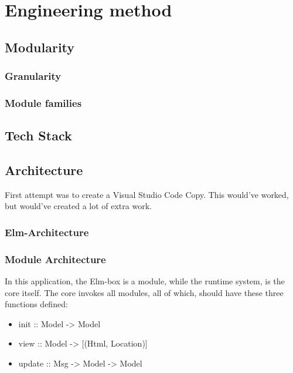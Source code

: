 \chapter{Engineering method}

\section{Modularity}

\subsection{Granularity}

\subsection{Module families}

\section{Tech Stack}

\section{Architecture}


First attempt was to create a Visual Studio Code Copy. This would've worked, but
would've created a lot of extra work.


\subsection{Elm-Architecture}


\subsection{Module Architecture}

In this application, the Elm-box is a module, while the runtime system, is the
core itself. The core invokes all modules, all of which, should have these three
functions defined:




\begin{itemize}
  \item init :: Model -> Model
  \item view :: Model -> [(Html, Location)]
  \item update :: Msg -> Model -> Model
\end{itemize}

